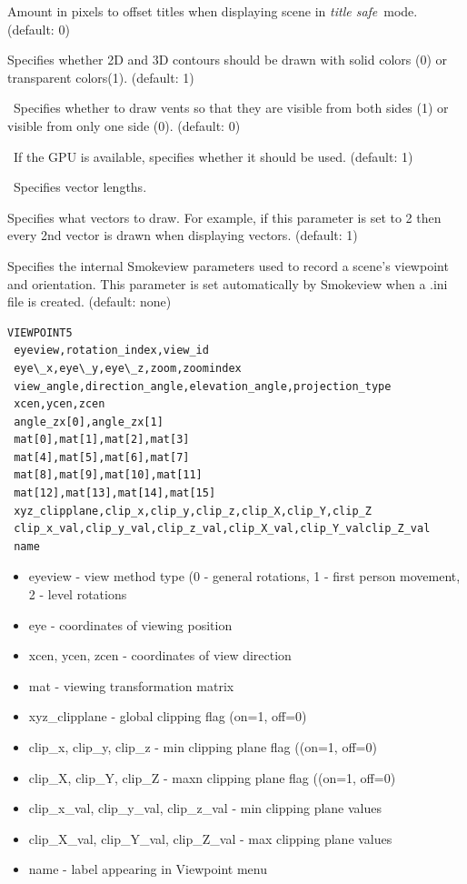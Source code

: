 \documentclass[11pt,twoside]{book}
\newcommand{\hitem}[1]{\item[{\bf #1} \hfill]}
\begin{document}
\hitem{TITLESAFE}Amount in pixels to offset titles when displaying
scene in {\em title safe}\ mode.   (default: 0)

\hitem{TRANSPARENT}Specifies whether 2D and 3D contours should be
drawn with solid colors (0) or transparent colors(1). (default: 1)

\hitem{TWOSIDEDVENTS}\  Specifies whether to draw vents so that they are visible from
both sides (1) or visible from only one side (0).  (default: 0)

\hitem{USEGPU}\ If the GPU is available, specifies whether it should be used. (default: 1)


\hitem{VECLENGTH}\ Specifies vector lengths.

\hitem{VECTORSKIP}Specifies
what vectors to draw.  For example, if this parameter is set to 2 then
every 2nd vector is drawn when displaying vectors.
(default: 1)

\hitem{VIEWPOINT5}Specifies the internal Smokeview parameters used
to record a scene's viewpoint and orientation.  This parameter is
set automatically by Smokeview when a .ini file is created.
(default: none)

{\small
\begin{lstlisting}
VIEWPOINT5
 eyeview,rotation_index,view_id
 eye\_x,eye\_y,eye\_z,zoom,zoomindex
 view_angle,direction_angle,elevation_angle,projection_type
 xcen,ycen,zcen
 angle_zx[0],angle_zx[1]
 mat[0],mat[1],mat[2],mat[3]
 mat[4],mat[5],mat[6],mat[7]
 mat[8],mat[9],mat[10],mat[11]
 mat[12],mat[13],mat[14],mat[15]
 xyz_clipplane,clip_x,clip_y,clip_z,clip_X,clip_Y,clip_Z
 clip_x_val,clip_y_val,clip_z_val,clip_X_val,clip_Y_valclip_Z_val
 name
\end{lstlisting}
}

\begin{itemize}
\item eyeview - view method type (0 - general rotations,
1 - first person movement, 2 - level rotations
\item eye - coordinates of viewing position
\item xcen, ycen, zcen - coordinates of view direction
\item mat - viewing transformation matrix
\item xyz\_clipplane - global clipping flag (on=1, off=0)
\item clip\_x, clip\_y, clip\_z - min clipping plane flag ((on=1, off=0)
\item clip\_X, clip\_Y, clip\_Z - maxn clipping plane flag ((on=1, off=0)
\item clip\_x\_val, clip\_y\_val, clip\_z\_val - min clipping plane values
\item clip\_X\_val, clip\_Y\_val, clip\_Z\_val - max clipping plane values
\item name - label appearing in Viewpoint menu
\end{itemize}
\end{document}
